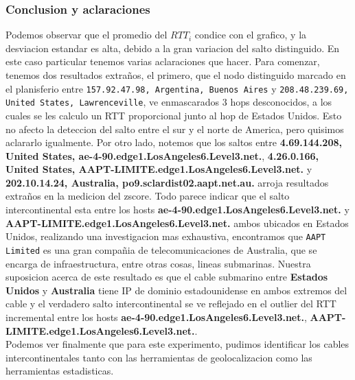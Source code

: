 \subsubsection{Conclusion y aclaraciones}
Podemos observar que el promedio del $RTT_i$ condice con el grafico, y la desviacion estandar es alta, debido a la gran variacion del salto distinguido. En este caso particular tenemos varias aclaraciones que hacer. Para comenzar, tenemos dos resultados extraños, el primero, que el nodo distinguido marcado en el planisferio entre \texttt{157.92.47.98, Argentina, Buenos Aires} y \texttt{208.48.239.69, United States, Lawrenceville}, ve enmascarados 3 hops desconocidos, a los cuales se les calculo un RTT proporcional junto al hop de Estados Unidos. Esto no afecto la deteccion del salto entre el sur y el norte de America, pero quisimos aclararlo igualmente. Por otro lado, notemos que los saltos entre \textbf{4.69.144.208, United States, ae-4-90.edge1.LosAngeles6.Level3.net.},   \textbf{4.26.0.166, United States, AAPT-LIMITE.edge1.LosAngeles6.Level3.net.} y \textbf{202.10.14.24, Australia, po9.sclardist02.aapt.net.au.} arroja resultados extraños en la medicion del zscore. Todo parece indicar que el salto intercontinental esta entre los hosts \textbf{ae-4-90.edge1.LosAngeles6.Level3.net.} y \textbf{AAPT-LIMITE.edge1.LosAngeles6.Level3.net.} ambos ubicados en Estados Unidos, realizando una investigacion mas exhaustiva, encontramos que \texttt{AAPT Limited} es una gran compañia de telecomunicaciones de Australia, que se encarga de infraestructura, entre otras cosas, lineas submarinas. Nuestra suposicion acerca de este resultado es que el cable submarino entre \textbf{Estados Unidos} y \textbf{Australia} tiene IP de dominio estadounidense en ambos extremos del cable y el verdadero salto intercontinental se ve reflejado en el outlier del RTT incremental entre los hosts \textbf{ae-4-90.edge1.LosAngeles6.Level3.net.}, \textbf{AAPT-LIMITE.edge1.LosAngeles6.Level3.net.}.\\
Podemos ver finalmente que para este experimento, pudimos identificar los cables intercontinentales tanto con las herramientas de geolocalizacion como las herramientas estadisticas.